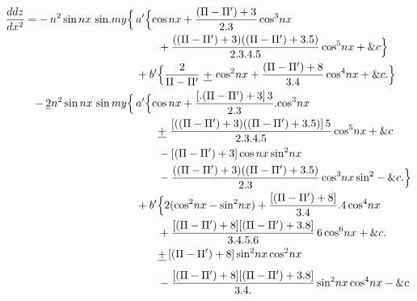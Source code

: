 \documentclass[11pt,a4paper]{article}
\begin{document}
\begin{align*}
\frac{ddz}{dx^2} = -\,n^2\,\text{sin}\,nx\ \text{sin}.my\Bigl\{\,&a'\Bigl\{\text{cos}\,nx + \frac{(\Pi-\Pi')+3}{2.3}\,\text{cos}^3nx\\
&\qquad + \frac{((\Pi-\Pi')+3)((\Pi-\Pi')+3.5)}{2.3.4.5}\,\text{cos}^5nx + \&c\Bigr\}\\
&+b'\Bigl\{\frac{2}{\Pi-\Pi'}\ \struck{+}\ \text{cos}^2nx + \frac{(\Pi-\Pi')+8}{3.4}\,\text{cos}^4nx + \&c.\Bigr\}\\
-\,\struck{2}n^2\,\text{sin}\,nx\ \text{sin}\,my\Bigl\{\,&a'\Bigl\{\text{cos}\,nx + \frac{[.(\Pi-\Pi')+3]\,3}{2.3}.\text{cos}^3nx\\
&\qquad \struck{+}\ \frac{[((\Pi-\Pi')+3)((\Pi-\Pi')+3.5)]\,5}{2.3.4.5}\,\text{cos}^5nx + \&c\\
&\qquad - [(\Pi-\Pi')+3]\,\text{cos}\,nx\,\text{sin}^2nx\\
&\qquad - \frac{((\Pi-\Pi')+3)((\Pi-\Pi')+3.5)}{2.3}\,\text{cos}^3nx\,\text{sin}^2 - \&c.\Bigr\}\\
&+b'\Bigl\{2(\text{cos}^2nx - \text{sin}^2nx) + \frac{[(\Pi-\Pi')+8]}{3.4}.4\,\text{cos}^4nx\\
&\qquad + \frac{[(\Pi-\Pi')+8][(\Pi-\Pi')+3.8]}{3.4.5.6}\,6\,\text{cos}^6nx + \&c.\\
&\qquad \struck{+}\,[(\Pi-\Pi')+8]\,\text{sin}^2nx\,\text{cos}^2nx\\
&\qquad - \frac{[(\Pi-\Pi')+8][(\Pi-\Pi')+3.8]}{3.4.}\,\text{sin}^2nx\,\text{cos}^4nx - \&c
\end{align*}
\end{document}
